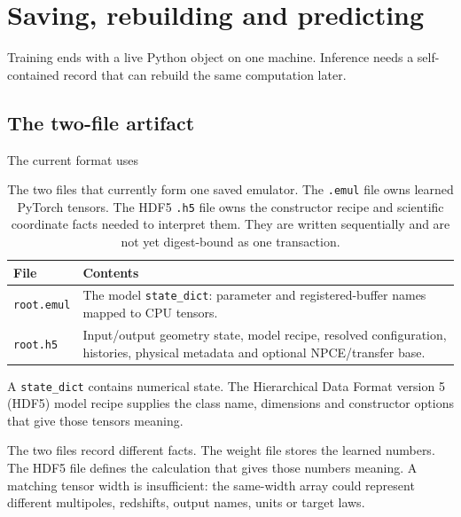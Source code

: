 \documentclass[10pt,aps,prd,twocolumn,nofootinbib]{revtex4-2}
\newcommand{\code}[1]{\texttt{#1}}
\begin{document}
\section{Saving, rebuilding and predicting}
\label{chap:artifacts}

Training ends with a live Python object on one machine.  Inference needs a
self-contained record that can rebuild the same computation later.

\subsection{The two-file artifact}

The current format uses
\begin{table}[t]
\centering
\begin{tabular}{p{}p{}}
\toprule
File & Contents \\
\midrule
\code{root.emul} & The model \code{state\_dict}: parameter and registered-buffer
names mapped to CPU tensors.  \\
\code{root.h5} & Input/output geometry state, model recipe, resolved
configuration, histories, physical metadata and optional NPCE/transfer base.  \\
\bottomrule
\end{tabular}
\caption{The two files that currently form one saved emulator.  The
\code{.emul} file owns learned PyTorch tensors.  The HDF5 \code{.h5} file owns
the constructor recipe and scientific coordinate facts needed to interpret
them.  They are written sequentially and are not yet digest-bound as one
transaction.}
\label{tab:artifact-files}
\end{table}

A \code{state\_dict} contains numerical state.  The Hierarchical Data Format
version 5 (HDF5) model recipe supplies the class name, dimensions and
constructor options that give those tensors meaning.

The two files record different facts.  The weight file stores the learned
numbers.  The HDF5 file defines the calculation that gives those numbers
meaning.  A matching tensor width is insufficient: the same-width
array could represent different multipoles, redshifts, output names, units or
target laws.
\end{document}
